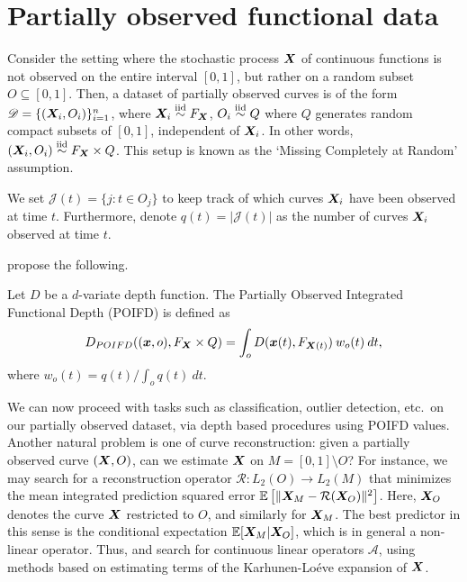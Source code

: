 \section{Partially observed functional data}

Consider the setting where the stochastic process $\bm{X}$ of continuous
functions is not observed on the entire interval $[0, 1]$, but rather on a
random subset $O \subseteq [0, 1]$.
Then, a dataset of partially observed curves is of the form $\mathscr{D} =
\{(\bm{X}_i, O_i)\}_{i = 1}^n$, where $\bm{X}_i \overset{\text{iid}}{\sim} F_{\bm{X}}$, $O_i \overset{\text{iid}}{\sim} Q$ where
$Q$ generates random compact subsets of $[0, 1]$, independent of $\bm{X}_i$.
In other words, $(\bm{X}_i, O_i) \overset{\text{iid}}{\sim} F_{\bm{X}} \times Q$.
This setup is known as the `Missing Completely at Random' assumption.

We set $\mathscr{J}(t) = \{j\colon t \in O_j\}$ to keep track of which curves
$\bm{X}_i$ have been observed at time $t$.
Furthermore, denote $q(t) = |\mathscr{J}(t)|$ as the number of curves $\bm{X}_i$
observed at time $t$.

\textcite{elias-jimenez-paganoni-sangalli-2023} propose the following.

\begin{definition}
    Let $D$ be a $d$-variate depth function.
    The Partially Observed Integrated Functional Depth (POIFD) is defined as
    \begin{equation}
        D_{POIFD}((\bm{x}, o), F_{\bm{X}} \times Q) = \int_o D(\bm{x}(t), F_{\bm{X}(t)})\:w_o(t) \:dt,
    \end{equation}
    where $w_o(t) = q(t) / \int_o q(t)\:dt$.
\end{definition}

We can now proceed with tasks such as classification, outlier detection, etc.\
on our partially observed dataset, via depth based procedures using POIFD
values.
Another natural problem is one of curve reconstruction: given a partially
observed curve $(\bm{X}, O)$, can we estimate $\bm{X}$ on $M = [0, 1]\setminus O$?
For instance, we may search for a reconstruction operator $\mathcal{R}\colon
L_2(O) \to L_2(M)$ that minimizes the mean integrated prediction squared error
$\operatorname{\mathbb{E}}\left[\Vert \bm{X}_M - \mathcal{R}(\bm{X}_O) \Vert^2\right]$.
Here, $\bm{X}_O$ denotes the curve $\bm{X}$ restricted to $O$, and similarly for
$\bm{X}_M$.
The best predictor in this sense is the conditional expectation $\operatorname{\mathbb{E}}[\bm{X}_M |
\bm{X}_O]$, which is in general a non-linear operator.
Thus, \textcite{kraus-2015} and \textcite{kneip-liebl-2020} search for
continuous linear operators $\mathcal{A}$, using methods based on estimating
terms of the Karhunen-Lo\'eve expansion of $\bm{X}$.


